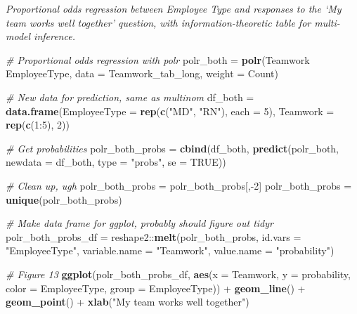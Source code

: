 \documentclass[]{book}
\newenvironment{Shaded}{\begin{snugshade}}{\end{snugshade}}
\newcommand{\KeywordTok}[1]{\textcolor[rgb]{0.13,0.29,0.53}{\textbf{{#1}}}}
\newcommand{\DataTypeTok}[1]{\textcolor[rgb]{0.13,0.29,0.53}{{#1}}}
\newcommand{\DecValTok}[1]{\textcolor[rgb]{0.00,0.00,0.81}{{#1}}}
\newcommand{\StringTok}[1]{\textcolor[rgb]{0.31,0.60,0.02}{{#1}}}
\newcommand{\CommentTok}[1]{\textcolor[rgb]{0.56,0.35,0.01}{\textit{{#1}}}}
\newcommand{\OtherTok}[1]{\textcolor[rgb]{0.56,0.35,0.01}{{#1}}}
\newcommand{\NormalTok}[1]{{#1}}
\begin{document}
\emph{Proportional odds regression between Employee Type and responses
to the `My team works well together' question, with
information-theoretic table for multi-model inference.}

\begin{Shaded}
\begin{Highlighting}[]
\CommentTok{# Proportional odds regression with polr}
\NormalTok{polr_both =}\StringTok{ }\KeywordTok{polr}\NormalTok{(Teamwork ~}\StringTok{ }\NormalTok{EmployeeType, }\DataTypeTok{data =} \NormalTok{Teamwork_tab_long, }
  \DataTypeTok{weight =} \NormalTok{Count)}

\CommentTok{# New data for prediction, same as multinom}
\NormalTok{df_both =}\StringTok{ }\KeywordTok{data.frame}\NormalTok{(}\DataTypeTok{EmployeeType =} \KeywordTok{rep}\NormalTok{(}\KeywordTok{c}\NormalTok{(}\StringTok{"MD"}\NormalTok{, }\StringTok{"RN"}\NormalTok{), }\DataTypeTok{each =} \DecValTok{5}\NormalTok{),  }
  \DataTypeTok{Teamwork =} \KeywordTok{rep}\NormalTok{(}\KeywordTok{c}\NormalTok{(}\DecValTok{1}\NormalTok{:}\DecValTok{5}\NormalTok{), }\DecValTok{2}\NormalTok{))}

\CommentTok{# Get probabilities}
\NormalTok{polr_both_probs =}\StringTok{ }\KeywordTok{cbind}\NormalTok{(df_both, }\KeywordTok{predict}\NormalTok{(polr_both, }\DataTypeTok{newdata =} \NormalTok{df_both, }
  \DataTypeTok{type =} \StringTok{"probs"}\NormalTok{, }\DataTypeTok{se =} \OtherTok{TRUE}\NormalTok{))}

\CommentTok{# Clean up, ugh}
\NormalTok{polr_both_probs =}\StringTok{ }\NormalTok{polr_both_probs[,-}\DecValTok{2}\NormalTok{]}
\NormalTok{polr_both_probs =}\StringTok{ }\KeywordTok{unique}\NormalTok{(polr_both_probs)}

\CommentTok{# Make data frame for ggplot, probably should figure out tidyr}
\NormalTok{polr_both_probs_df =}\StringTok{ }\NormalTok{reshape2::}\KeywordTok{melt}\NormalTok{(polr_both_probs, }\DataTypeTok{id.vars =} \StringTok{"EmployeeType"}\NormalTok{, }
  \DataTypeTok{variable.name =} \StringTok{"Teamwork"}\NormalTok{, }\DataTypeTok{value.name =} \StringTok{"probability"}\NormalTok{)}

\CommentTok{# Figure 13}
\KeywordTok{ggplot}\NormalTok{(polr_both_probs_df, }\KeywordTok{aes}\NormalTok{(}\DataTypeTok{x =} \NormalTok{Teamwork, }\DataTypeTok{y =} \NormalTok{probability, }
    \DataTypeTok{color =} \NormalTok{EmployeeType, }\DataTypeTok{group =} \NormalTok{EmployeeType)) +}
\StringTok{  }\KeywordTok{geom_line}\NormalTok{() +}\StringTok{ }
\StringTok{  }\KeywordTok{geom_point}\NormalTok{() +}
\StringTok{  }\KeywordTok{xlab}\NormalTok{(}\StringTok{"My team works well together"}\NormalTok{)}
\end{Highlighting}
\end{Shaded}
\end{document}
